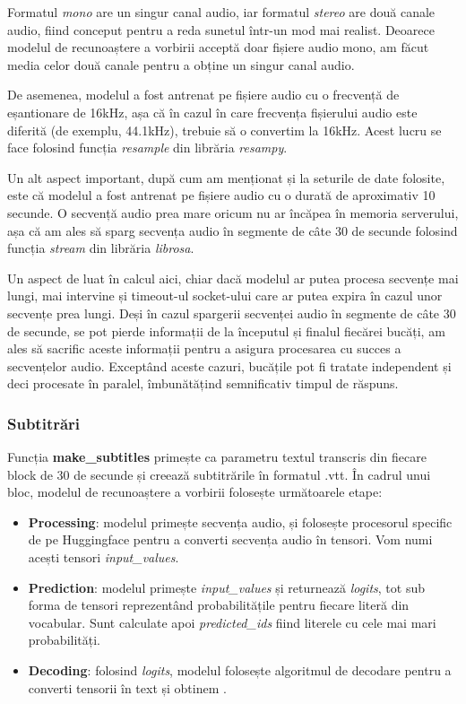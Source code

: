 \par
Formatul \textit{mono} are un singur canal audio, iar formatul \textit{stereo} are două canale audio, 
fiind conceput pentru a reda sunetul într-un mod mai realist. Deoarece modelul de recunoaștere a vorbirii
acceptă doar fișiere audio mono, am făcut media celor două canale pentru a obține un singur canal audio.

\par
De asemenea, modelul a fost antrenat pe fișiere audio cu o frecvență de eșantionare de 16kHz, așa că
în cazul în care frecvența fișierului audio este diferită (de exemplu, 44.1kHz), trebuie să o convertim
la 16kHz. Acest lucru se face folosind funcția \textit{resample} din librăria \textit{resampy}.

\par
Un alt aspect important, după cum am menționat și la seturile de date folosite, este că modelul a fost
antrenat pe fișiere audio cu o durată de aproximativ 10 secunde. O secvență audio prea mare oricum
nu ar încăpea în memoria serverului, așa că am ales să sparg secvența audio în segmente de câte 30 de
secunde folosind funcția \textit{stream} din librăria \textit{librosa}.

\par
Un aspect de luat în calcul aici, chiar dacă modelul ar putea procesa secvențe mai lungi, mai
intervine și timeout-ul socket-ului care ar putea expira în cazul unor secvențe prea lungi. Deși în
cazul spargerii secvenței audio în segmente de câte 30 de secunde, se pot pierde informații de 
la începutul și finalul fiecărei bucăți, am ales să sacrific aceste informații pentru a asigura
procesarea cu succes a secvențelor audio. Exceptând aceste cazuri, bucățile pot fi tratate independent
și deci procesate în paralel, îmbunătățind semnificativ timpul de răspuns.

\subsubsection{Subtitrări}
\par
Funcția \textbf{make\_subtitles} primește ca parametru textul transcris din fiecare block de 30 de secunde
și creează subtitrările în formatul .vtt. În cadrul unui bloc, modelul de recunoaștere a vorbirii 
folosește următoarele etape:
\begin{itemize}
    \item \textbf{Processing}: modelul primește secvența audio, și folosește procesorul specific de pe
    Huggingface pentru a converti secvența audio în tensori. Vom numi acești tensori \textit{input\_values}.
    \item \textbf{Prediction}: modelul primește \textit{input\_values} și returnează \textit{logits}, tot
    sub forma de tensori reprezentând probabilitățile pentru fiecare literă din vocabular. Sunt calculate
    apoi \textit{predicted\_ids} fiind literele cu cele mai mari probabilități.
    \item \textbf{Decoding}: folosind \textit{logits}, modelul folosește algoritmul de decodare pentru a
    converti tensorii în text și obtinem .
\end{itemize}

